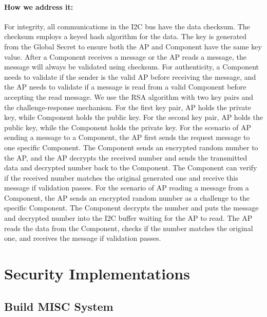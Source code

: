 \documentclass[11pt,oneside,onecolumn,letterpaper]{article}
\newcounter{alg}
\begin{document}
	\paragraph{How we address it:}
	For integrity,
	all communications in the I2C bus have the data checksum.
	The checksum employs a keyed hash algorithm for the data.
	The key is generated from the Global Secret to ensure both the AP and Component have the same key value.
	After a Component receives a message or the AP reads a message,
	the message will always be validated using checksum.
	For authenticity,
	a Component needs to validate if the sender is the valid AP before receiving the message,
	and the AP needs to validate if a message is read from a valid Component before accepting the read message.
	We use the RSA algorithm with two key pairs and the challenge-response mechanism.
	For the first key pair,
	AP holds the private key,
	while Component holds the public key.
	For the second key pair,
	AP holds the public key,
	while the Component holds the private key.
	For the scenario of AP sending a message to a Component,
	the AP first sends the request message to one specific Component.
	The Component sends an encrypted random number to the AP,
	and the AP decrypts the received number and sends the transmitted data and decrypted number back to the Component.
	The Component can verify if the received number matches the original generated one and receive this message if validation passes.
	For the scenario of AP reading a message from a Component,
	the AP sends an encrypted random number as a challenge to the specific Component.
	The Component decrypts the number and puts the message and decrypted number into the I2C buffer waiting for the AP to read.
	The AP reads the data from the Component,
	checks if the number matches the original one,
	and receives the message if validation passes.
	
	
	\section{Security Implementations}
	
	
	\subsection{Build MISC System}
\end{document}
